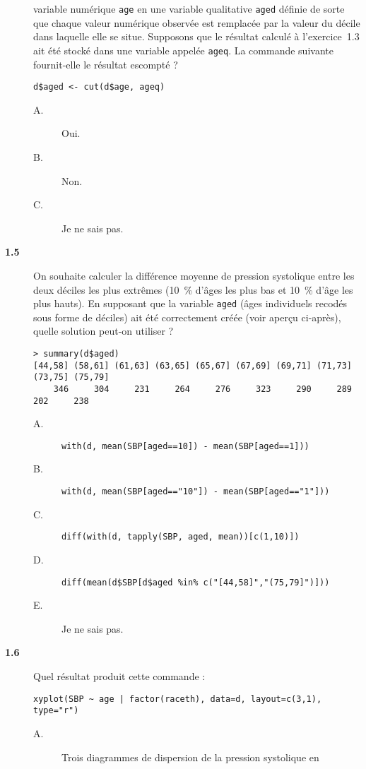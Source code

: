 \documentclass[11pt]{report}
\theoremstyle{definition}
\begin{document}
\begin{description}
  variable numérique \texttt{age} en une variable qualitative \texttt{aged}
  définie de sorte que chaque valeur numérique observée est remplacée par la
  valeur du décile dans laquelle elle se situe. Supposons que le résultat
  calculé à l'exercice~1.3 ait été stocké dans une variable appelée
  \texttt{ageq}. La commande suivante fournit-elle le résultat escompté ?
\begin{verbatim}
d$aged <- cut(d$age, ageq)
\end{verbatim}
  \begin{description}
  \item[A.] Oui.
  \item[B.] Non.
  \item[C.] Je ne sais pas.
  \end{description}
\item[\bf 1.5]  On souhaite calculer la différence
  moyenne de pression systolique entre les deux déciles les plus extrêmes
  (10~\% d'âges les plus bas et 10~\% d'âge les plus hauts). En supposant
  que la variable \texttt{aged} (âges individuels recodés sous forme de
  déciles) ait été correctement créée (voir aperçu ci-après), quelle
  solution peut-on utiliser ?
\begin{verbatim}
> summary(d$aged)
[44,58] (58,61] (61,63] (63,65] (65,67] (67,69] (69,71] (71,73] (73,75] (75,79] 
    346     304     231     264     276     323     290     289     202     238
\end{verbatim}
  \begin{description}
  \item[A.] \verb|with(d, mean(SBP[aged==10]) - mean(SBP[aged==1]))|
  \item[B.] \verb|with(d, mean(SBP[aged=="10"]) - mean(SBP[aged=="1"]))|
  \item[C.] \verb|diff(with(d, tapply(SBP, aged, mean))[c(1,10)])|
  \item[D.] \verb|diff(mean(d$SBP[d$aged %in% c("[44,58]","(75,79]")]))|
  \item[E.] Je ne sais pas.
  \end{description}  
\item[\bf 1.6]  Quel résultat produit cette commande : 
\begin{verbatim}
xyplot(SBP ~ age | factor(raceth), data=d, layout=c(3,1), type="r")
\end{verbatim}
  \begin{description}
  \item[A.] Trois diagrammes de dispersion de la pression systolique en

\end{description}
\end{description}
\end{document}
